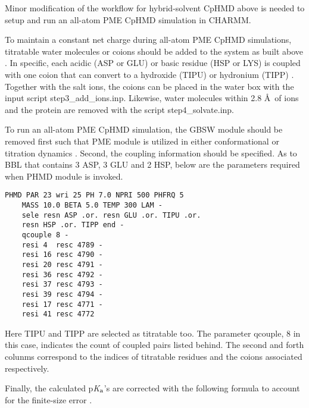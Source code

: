 \documentclass[9pt,tutorial]{livecoms}
\newcommand{\pka}{p\textit{K}$_{\rm a}$}
\begin{document}
Minor modification of the workflow for 
hybrid-solvent CpHMD above is needed 
to setup and run an all-atom PME CpHMD 
simulation in CHARMM. 

To maintain a constant net charge during 
all-atom PME CpHMD simulations, 
titratable water molecules  
or coions should be added to the 
system as built above \cite{Wallace_Shen_2012_J.Chem.Phys.}.
In specific, each acidic (ASP or GLU) or 
basic residue (HSP or LYS) is 
coupled with one coion that can convert 
to a hydroxide (TIPU) or hydronium (TIPP) 
\cite{Chen_Shen_2013_Biophys.J.}. 
Together with the salt ions, the coions 
can be placed in the water box with 
the input script step3\_add\_ions.inp.
Likewise, water molecules within 2.8 \AA\ 
of ions and the protein are removed 
with the script step4\_solvate.inp. 

To run an all-atom PME CpHMD simulation, 
the GBSW module should be 
removed first such that PME module is 
utilized in either conformational or 
titration dynamics \cite{Huang_Shen_2016_J.Chem.TheoryComput.}. 
Second, the coupling information should 
be specified. 
As to BBL that 
contains 3 ASP, 3 GLU and 2 HSP, below 
are the parameters required when PHMD module 
is invoked.  

%
\begin{lstlisting}
PHMD PAR 23 wri 25 PH 7.0 NPRI 500 PHFRQ 5 
    MASS 10.0 BETA 5.0 TEMP 300 LAM -
    sele resn ASP .or. resn GLU .or. TIPU .or. 
    resn HSP .or. TIPP end - 
    qcouple 8 - 
    resi 4  resc 4789 -
    resi 16 resc 4790 -
    resi 20 resc 4791 -
    resi 36 resc 4792 -
    resi 37 resc 4793 -
    resi 39 resc 4794 -
    resi 17 resc 4771 -
    resi 41 resc 4772 
\end{lstlisting}
%
Here TIPU and TIPP are selected as titratable too. 
The parameter qcouple, 8 in this case, indicates 
the count of coupled pairs listed behind. 
The second and forth 
colunms correspond to the indices of 
titratable residues and the coions 
associated respectively.

Finally, the calculated \pka's are 
corrected with the following formula 
to account for the finite-size error 
\cite{Huang_Shen_2016_J.Chem.TheoryComput.}.
\end{document}
